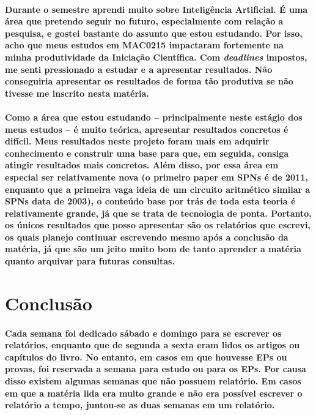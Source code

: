 \documentclass[a4paper,10pt]{article}
\theoremstyle{plain}
\begin{document}
\paragraph{
  Durante o semestre aprendi muito sobre Inteligência Artificial. É uma área que pretendo seguir no
  futuro, especialmente com relação a pesquisa, e gostei bastante do assunto que estou estudando.
  Por isso, acho que meus estudos em MAC0215 impactaram fortemente na minha produtividade da
  Iniciação Científica. Com \textit{deadlines} impostos, me senti pressionado a estudar e a
  apresentar resultados. Não conseguiria apresentar os resultados de forma tão produtiva se não
  tivesse me inscrito nesta matéria.
}

\paragraph{
  Como a área que estou estudando -- principalmente neste estágio dos meus estudos -- é muito
  teórica, apresentar resultados concretos é difícil. Meus resultados neste projeto foram mais em
  adquirir conhecimento e construir uma base para que, em seguida, consiga atingir resultados mais
  concretos. Além disso, por essa área em especial ser relativamente nova (o primeiro paper em SPNs
  é de 2011, enquanto que a primeira vaga ideia de um circuito aritmético similar a SPNs data de
  2003\cite{diff-approach-darwiche}), o conteúdo base por trás de toda esta teoria é relativamente
  grande, já que se trata de tecnologia de ponta. Portanto, os únicos resultados que posso
  apresentar são os relatórios que escrevi, os quais planejo continuar escrevendo mesmo após a
  conclusão da matéria, já que são um jeito muito bom de tanto aprender a matéria quanto arquivar
  para futuras consultas.
}

\section{Conclusão}

\paragraph{
  Cada semana foi dedicado sábado e domingo para se escrever os relatórios, enquanto que de segunda
  a sexta eram lidos os artigos ou capítulos do livro. No entanto, em casos em que houvesse EPs ou
  provas, foi reservada a semana para estudo ou para os EPs. Por causa disso existem algumas
  semanas que não possuem relatório. Em casos em que a matéria lida era muito grande e não era
  possível escrever o relatório a tempo, juntou-se as duas semanas em um relatório.
}
\end{document}
